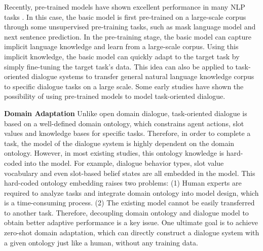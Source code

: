 \documentclass[10pt,twocolumn,letterpaper]{article}
\begin{document}
Recently, pre-trained models have shown excellent performance in many NLP tasks \cite{devlin2018bert,DBLP:conf/naacl/PetersNIGCLZ18,radford2018improving}. In this case, the basic model is first pre-trained on a large-scale corpus through some unsupervised pre-training tasks, such as mask language model and next sentence prediction. In the pre-training stage, the basic model can capture implicit language knowledge and learn from a large-scale corpus. Using this implicit knowledge, the basic model can quickly adapt to the target task by simply fine-tuning the target task's data. This idea can also be applied to task-oriented dialogue systems to transfer general natural language knowledge corpus to specific dialogue tasks on a large scale. Some early studies have shown the possibility of using pre-trained models to model task-oriented dialogue\cite{peng2020few,wolf2019transfertransfo,budzianowski2019hello,mehri2019pretraining}.

\textbf{Domain Adaptation}
Unlike open domain dialogue, task-oriented dialogue is based on a well-defined domain ontology, which constrains agent actions, slot values and knowledge bases for specific tasks. Therefore, in order to complete a task, the model of the dialogue system is highly dependent on the domain ontology. However, in most existing studies, this ontology knowledge is hard-coded into the model. For example, dialogue behavior types, slot value vocabulary and even slot-based belief states are all embedded in the model. This hard-coded ontology embedding raises two problems: (1) Human experts are required to analyze tasks and integrate domain ontology into model design, which is a time-consuming process. (2) The existing model cannot be easily transferred to another task. Therefore, decoupling domain ontology and dialogue model to obtain better adaptive performance is a key issue. One ultimate goal is to achieve zero-shot domain adaptation, which can directly construct a dialogue system with a given ontology just like a human, without any training data.
\end{document}
